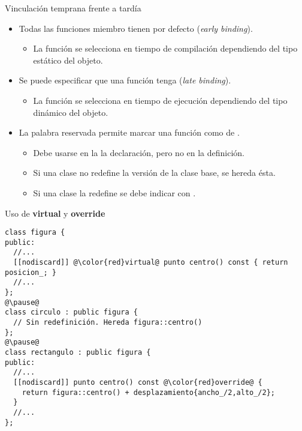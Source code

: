 \begin{frame}[t,fragile]{Vinculación temprana frente a tardía}
\begin{itemize}
  \item Todas las funciones miembro tienen por defecto 
         (\emph{early binding}).
    \begin{itemize}
      \item La función se selecciona en tiempo de compilación dependiendo
            del tipo estático del objeto.
    \end{itemize}

  \item Se puede especificar que una función tenga
         (\emph{late binding}).
    \begin{itemize}
      \item La función se selecciona en tiempo de ejecución dependiendo
            del tipo dinámico del objeto.
    \end{itemize}

  \item La palabra reservada  permite marcar una función
        como de .
    \begin{itemize}
      \item Debe usarse en la la declaración, pero no en la definición.
      \item Si una clase no redefine la versión de la clase base, se hereda ésta.
      \item Si una clase la redefine se debe indicar con .
    \end{itemize}
\end{itemize}
\end{frame}

\begin{frame}[t,fragile]{Uso de \textbf{virtual} y \textbf{override}}
\begin{lstlisting}[escapechar=@]
class figura {
public:
  //...
  [[nodiscard]] @\color{red}virtual@ punto centro() const { return posicion_; }
  //...
};
@\pause@
class circulo : public figura {
  // Sin redefinición. Hereda figura::centro()
};
@\pause@
class rectangulo : public figura {
public:
  //...
  [[nodiscard]] punto centro() const @\color{red}override@ {
    return figura::centro() + desplazamiento{ancho_/2,alto_/2};
  }
  //...
};
\end{lstlisting}
\end{frame}


